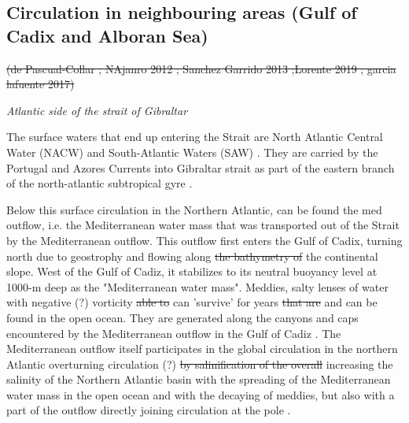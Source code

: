 \subsection{Circulation in neighbouring areas (Gulf of Cadix and Alboran Sea)}

 \color{blue}\sout{(de Pascual-Collar ; NAjanro 2012 ; Sanchez Garrido 2013 ;Lorente 2019 ; garcia lafuente 2017)} 
 \color{black}


\textit{Atlantic side \color{blue}of the strait of Gibraltar \color{black}}

The surface waters that end up entering the Strait are \color{blue} North Atlantic Central Water (NACW) \color{black} and South-Atlantic Waters (SAW) \color{black} \citep{millot_2014,naranjo_2015}. They are carried by the Portugal and Azores Currents into  \color{blue}Gibraltar strait \color{black} as part of the eastern branch of the north-atlantic subtropical gyre \citep{barton_2001}.

Below this surface circulation \color{blue}in the Northern Atlantic\color{black}, can \color{blue}be found \color{black} the med outflow, \color{blue} i.e. \color{black}the Mediterranean water mass that was transported out of the Strait by the Mediterranean outflow. \color{blue}This outflow first enters \color{black} the Gulf of Cadix,  \color{blue}turning \color{black} north due to geostrophy and flowing along \sout{the bathymetry of} the continental slope\citep{price_1993,gasser_2017}. \color{blue} West of the Gulf of Cadiz, it \color{black} stabilizes to its neutral buoyancy level at \color{blue} 1000-m deep \color{black} as the "Mediterranean water mass"\citep{price_1993}. Meddies, salty lenses of water with negative  \color{blue}(?) \color{black} vorticity \sout{able to} \color{blue}can  \color{black} 'survive' for years \sout{that are} \color{blue} and can be found \color{black} in the open ocean. \color{blue}They \color{black} are generated along the canyons and caps encountered by the Mediterranean outflow in the Gulf of Cadiz \citep{bashmachnikov_2015}. The Mediterranean outflow itself participates in the global circulation \color{blue}in the \color{blue}northern Atlantic \color{black} overturning circulation \color{blue}(?) \color{black} \sout{by salinification of the overall}  \color{blue}increasing the salinity of the Northern Atlantic basin \color{black} with the spreading of the Mediterranean water mass in the open ocean and with the decaying of meddies, but also with a part of the outflow directly joining circulation at the pole \citep{price_1993,jia_2007}.\\


